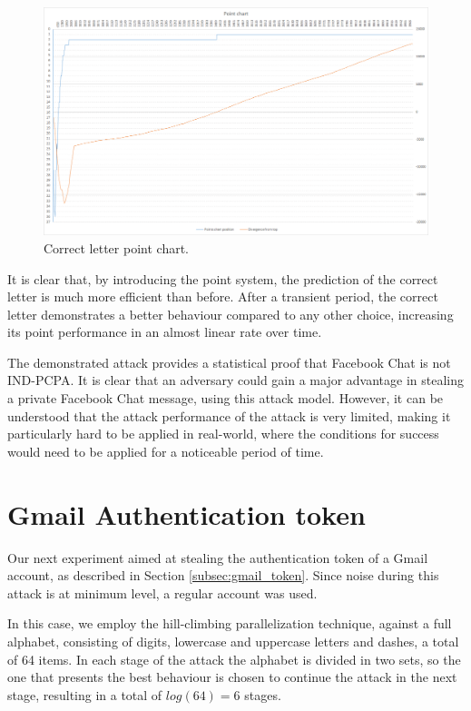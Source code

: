 \begin{figure}[H] \caption{Correct letter point chart.}
\includegraphics[width=1\textwidth]{diagrams/point_system_chart_2.png}\end{figure}

It is clear that, by introducing the point system, the prediction of the correct
letter is much more efficient than before. After a transient period, the correct
letter demonstrates a better behaviour compared to any other choice, increasing
its point performance in an almost linear rate over time.

The demonstrated attack provides a statistical proof that Facebook Chat is not
IND-PCPA. It is clear that an adversary could gain a major advantage in stealing a
private Facebook Chat message, using this attack model. However, it can be
understood that the attack performance of the attack is very limited, making it
particularly hard to be applied in real-world, where the conditions for success
would need to be applied for a noticeable period of time.

\section{Gmail Authentication token}\label{sec:gmail_experiment}

Our next experiment aimed at stealing the authentication token of a Gmail
account, as described in Section \ref{subsec:gmail_token}. Since noise during
this attack is at minimum level, a regular account was used.

In this case, we employ the hill-climbing parallelization technique, against a
full alphabet, consisting of digits, lowercase and uppercase letters and dashes,
a total of 64 items. In each stage of the attack the alphabet is divided in two
sets, so the one that presents the best behaviour is chosen to continue the
attack in the next stage, resulting in a total of \begin{math}log(64) =
6\end{math} stages.

